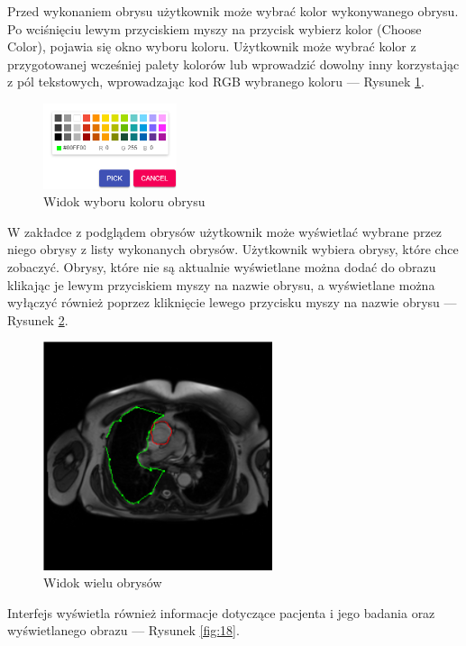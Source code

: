 \documentclass[a4paper,11pt,twoside,openright]{report}
\theoremstyle{definition}
\begin{document}
\begin{enumerate}
\pagebreak
Przed wykonaniem obrysu użytkownik może wybrać kolor wykonywanego obrysu.
Po wciśnięciu lewym przyciskiem myszy na przycisk wybierz kolor (Choose Color),
pojawia się okno wyboru koloru. Użytkownik może wybrać kolor z przygotowanej
wcześniej palety kolorów lub wprowadzić dowolny inny korzystając z pól tekstowych,
wprowadzając kod RGB wybranego koloru --- Rysunek \ref{fig:16}.

\begin{figure}[h!]
	\center
	\includegraphics[width=0.35\textwidth]{16}
	\caption{Widok wyboru koloru obrysu}
    	\label{fig:16}
\end{figure}

W zakładce z podglądem obrysów użytkownik może wyświetlać wybrane przez niego
obrysy z listy wykonanych obrysów. Użytkownik wybiera obrysy, które chce zobaczyć.
Obrysy, które nie są aktualnie wyświetlane można dodać do obrazu klikając je
lewym przyciskiem myszy na nazwie obrysu, a wyświetlane można wyłączyć również
poprzez kliknięcie lewego przycisku myszy na nazwie obrysu --- Rysunek \ref{fig:17}.

\begin{figure}[h!]
	\center
	\includegraphics[width=0.6\textwidth]{17}
	\caption{Widok wielu obrysów}
    	\label{fig:17}
\end{figure}

\pagebreak

Interfejs wyświetla również informacje dotyczące pacjenta i jego badania oraz
wyświetlanego obrazu --- Rysunek \ref{fig:18}.


\end{enumerate}
\end{document}
